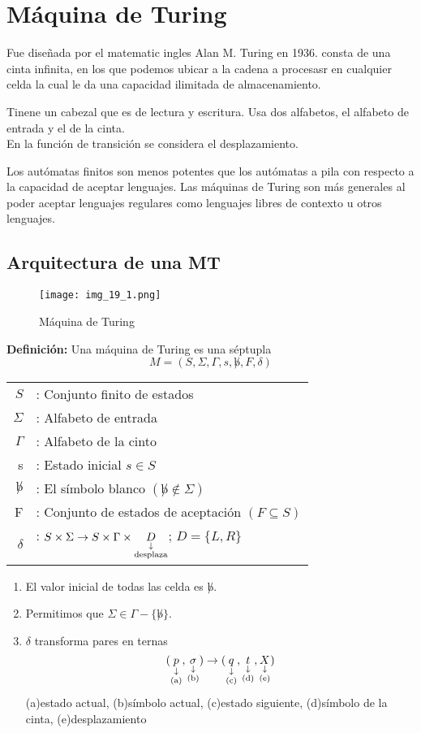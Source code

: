 \chapter{Máquina de Turing}

Fue diseñada por el matematic ingles Alan M. Turing en 1936. consta de una cinta infinita, en los que podemos ubicar a la cadena a procesasr en cualquier celda la cual le da una capacidad ilimitada de almacenamiento.

Tinene un cabezal que es de lectura y escritura. Usa dos alfabetos, el alfabeto de entrada y el de la cinta.\\
En la función de transición se considera el desplazamiento.

Los autómatas finitos son menos potentes que los autómatas a pila con respecto a la capacidad de aceptar lenguajes. Las máquinas de Turing son más generales al poder aceptar lenguajes regulares como lenguajes libres de contexto u otros lenguajes.

\section{Arquitectura de una MT}
\begin{figure}[h!]
\centering
\texttt{[image: img\_19\_1.png]}
\caption{Máquina de Turing}\label{img_19_1}
\end{figure}

\textbf{Definición: }Una máquina de Turing es una séptupla
$$M=(S,\Sigma,\Gamma,s,\not b, F,\delta)$$
\begin{tabular}{rl}
$S$			&	: Conjunto finito de estados	\\
$\Sigma$	&	: Alfabeto de entrada	\\
$\Gamma$	&	: Alfabeto de la cinto	\\
s			&	: Estado inicial $s\in S$	\\
$\not b$	&	: El símbolo blanco $(\not b \not\in\Sigma )$	\\
F			&	: Conjunto de estados de aceptación $(F\subseteq S)$	\\
$\delta$	&	: $S\times\Sigma\rightarrow S\times\Gamma\times \downlegend{D}{desplaza}$; $D=\{L,R\}$
\end{tabular}

\begin{enumerate}
\item El valor inicial de todas las celda es $\not b$.
\item Permitimos que $\Sigma \in \Gamma -\{\not b\}$.
\item $\delta$ transforma pares en ternas
$$(\downlegend{p}{(a)},\downlegend{\sigma}{(b)})\rightarrow (\downlegend{q}{(c)},\downlegend{t}{(d)},\downlegend{X}{(e)})$$
(a)estado actual, (b)símbolo actual, (c)estado siguiente, (d)símbolo de la cinta, (e)desplazamiento
\end{enumerate}

